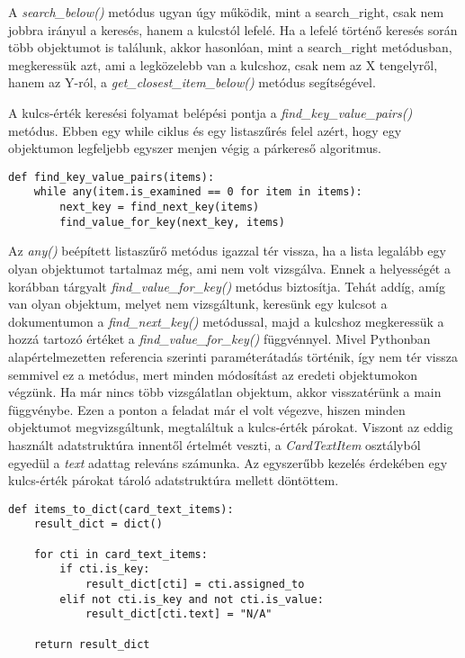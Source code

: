 \documentclass[12pt]{report}
\begin{document}
A \emph{search\_below()} metódus ugyan úgy működik, mint a search\_right, csak nem jobbra irányul a keresés, hanem a kulcstól lefelé. Ha a lefelé történő keresés során több objektumot is találunk, akkor hasonlóan, mint a search\_right metódusban, megkeressük azt, ami a legközelebb van a kulcshoz, csak nem az X tengelyről, hanem az Y-ról, a \emph{get\_closest\_item\_below()} metódus segítségével.

A kulcs-érték keresési folyamat belépési pontja a \emph{find\_key\_value\_pairs()} metódus. Ebben egy while ciklus és egy listaszűrés felel azért, hogy egy objektumon legfeljebb egyszer menjen végig a párkereső algoritmus.

\begin{verbatim}
def find_key_value_pairs(items):
    while any(item.is_examined == 0 for item in items):
        next_key = find_next_key(items)
        find_value_for_key(next_key, items)
\end{verbatim}

\noindent
Az \emph{any()} beépített listaszűrő metódus igazzal tér vissza, ha a lista legalább egy olyan objektumot tartalmaz még, ami nem volt vizsgálva. Ennek a helyességét a korábban tárgyalt \emph{find\_value\_for\_key()} metódus biztosítja. Tehát addíg, amíg van olyan objektum, melyet nem vizsgáltunk, keresünk egy kulcsot a dokumentumon a  \emph{find\_next\_key()} metódussal, majd a kulcshoz megkeressük a hozzá tartozó értéket a \emph{find\_value\_for\_key()} függvénnyel. Mivel Pythonban alapértelmezetten referencia szerinti paraméterátadás történik, így nem tér vissza semmivel ez a metódus, mert minden módosítást az eredeti objektumokon végzünk.
Ha már nincs több vizsgálatlan objektum, akkor visszatérünk a main függvénybe. Ezen a ponton a feladat már el volt végezve, hiszen minden objektumot megvizsgáltunk, megtaláltuk a kulcs-érték párokat. Viszont az eddig használt adatstruktúra innentől értelmét veszti, a \emph{CardTextItem} osztályból egyedül a \emph{text} adattag releváns számunka. Az egyszerűbb kezelés érdekében egy kulcs-érték párokat tároló adatstruktúra mellett döntöttem.

\newpage

\begin{verbatim}
def items_to_dict(card_text_items):
    result_dict = dict()

    for cti in card_text_items:
        if cti.is_key:
            result_dict[cti] = cti.assigned_to
        elif not cti.is_key and not cti.is_value:
            result_dict[cti.text] = "N/A"

    return result_dict
\end{verbatim}
\end{document}
